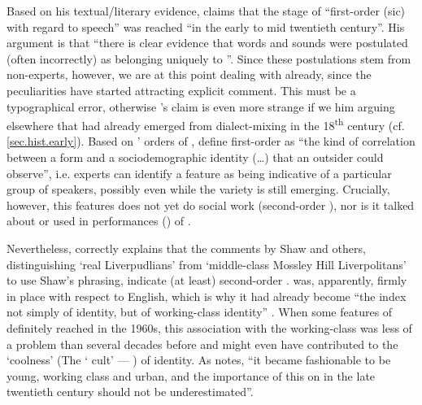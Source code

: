 Based on his textual/literary evidence, \citet[107]{crowley2012} claims that the stage of ``first-order (sic)  with regard to  speech'' was reached ``in the early to mid twentieth century''.
His argument is that ``there is clear evidence that words and sounds were postulated (often incorrectly) as belonging uniquely to ''.
Since these postulations stem from non-experts, however, we are at this point dealing with  already, since the peculiarities have started attracting explicit comment.
This must be a typographical error, otherwise \citeauthor{crowley2012}'s claim is even more strange if we  him arguing elsewhere that  had already emerged from dialect-mixing in the 18\textsuperscript{th} century (cf. \ref{sec.hist.early}).
Based on \citeauthor{silverstein2003}' \citeyear{silverstein2003} orders of , \textcite[81]{johnstoneetal2006} define first-order  as ``the kind of correlation between a form and a sociodemographic identity (\ldots) that an outsider could observe'', i.e. experts can identify a feature as being indicative of a particular group of speakers, possibly even while the variety is still emerging.
Crucially, however, this features does not yet do social work (second-order ), nor is it talked about or used in  performances () of  \parencite[cf.][83--84]{johnstoneetal2006}.

Nevertheless, \citeauthor{crowley2012} correctly explains that the comments by Shaw and others, distinguishing `real Liverpudlians' from `middle-class Mossley Hill Liverpolitans' to use Shaw's phrasing, indicate (at least) second-order .  was, apparently, firmly in place with respect to  English, which is why it had already become ``the index not simply of  identity, but of  working-class identity'' \citep[107]{crowley2012}.
When some features of  definitely reached  in the 1960s, this association with the working-class was less of a problem than several decades before and might even have contributed to the `coolness' (The ` cult' --- \citealt[109]{crowley2012}) of  identity.
As \citet[165]{wales2006} notes, ``it became fashionable to be young, working class and urban, and the importance of this on  in the late twentieth century should not be underestimated''.

